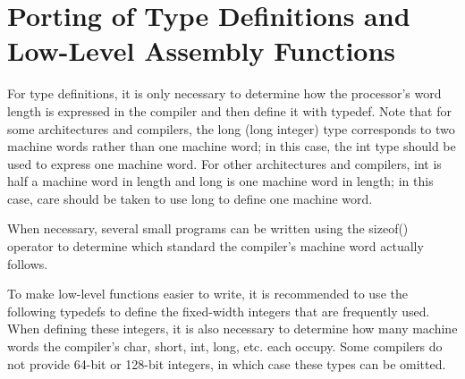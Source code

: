 \section{Porting of Type Definitions and Low-Level Assembly Functions}\label{sec:7-type-definition-and-assembly-function-porting}

For type definitions, it is only necessary to determine how the processor's word length is expressed in the compiler and then define it with typedef. Note that for some architectures and compilers, the long (long integer) type corresponds to two machine words rather than one machine word; in this case, the int type should be used to express one machine word. For other architectures and compilers, int is half a machine word in length and long is one machine word in length; in this case, care should be taken to use long to define one machine word.

When necessary, several small programs can be written using the sizeof() operator to determine which standard the compiler's machine word actually follows.

To make low-level functions easier to write, it is recommended to use the following typedefs to define the fixed-width integers that are frequently used. When defining these integers, it is also necessary to determine how many machine words the compiler's char, short, int, long, etc. each occupy. Some compilers do not provide 64-bit or 128-bit integers, in which case these types can be omitted.

